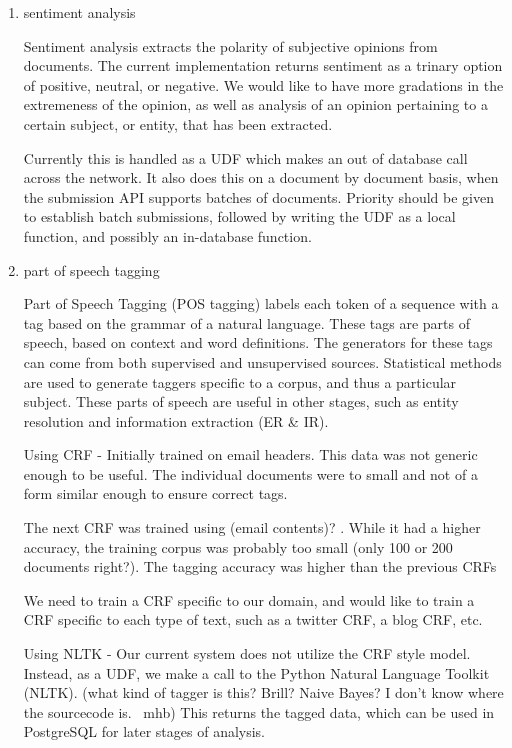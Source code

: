 \documentclass{article}
\begin{document}
\begin{enumerate}
\begin{enumerate}
\begin{enumerate}
    \item sentiment analysis

      Sentiment analysis extracts the polarity of subjective opinions from documents.
      The current implementation returns sentiment as a trinary option of positive, neutral, or negative.
      We would like to have more gradations in the extremeness of the opinion,
      as well as analysis of an opinion pertaining to a certain subject, or entity, that has been extracted.

      Currently this is handled as a UDF which makes an out of database call across the network.
      It also does this on a document by document basis,
      when the submission API supports batches of documents.
      Priority should be given to establish batch submissions,
      followed by writing the UDF as a local function,
      and possibly an in-database function.

    \item part of speech tagging

      Part of Speech Tagging (POS tagging) labels each token of a sequence with a tag based on the grammar of a natural language.
      These tags are parts of speech, based on context and word definitions.
      The generators for these tags can come from both supervised and unsupervised sources.
      Statistical methods are used to generate taggers specific to a corpus, and thus a particular subject.
      These parts of speech are useful in other stages, such as entity resolution and information extraction (ER \& IR).

      Using CRF -
      Initially trained on email headers.
      This data was not generic enough to be useful.
      The individual documents were to small and not of a form similar enough to ensure correct tags.

      The next CRF was trained using (email contents)? .
      While it had a higher accuracy, the training corpus was probably too small (only 100 or 200 documents right?).
      The tagging accuracy was higher than the previous CRFs

      We need to train a CRF specific to our domain,
      and would like to train a CRF specific to each type of text,
      such as a twitter CRF, a blog CRF, etc.

      Using NLTK -
      Our current system does not utilize the CRF style model.
      Instead, as a UDF, we make a call to the Python Natural Language Toolkit (NLTK).
      (what kind of tagger is this? Brill? Naive Bayes? I don't know where the sourcecode is. ~mhb)
      This returns the tagged data, which can be used in PostgreSQL for later stages of analysis.



\end{enumerate}
\end{enumerate}
\end{enumerate}
\end{document}
